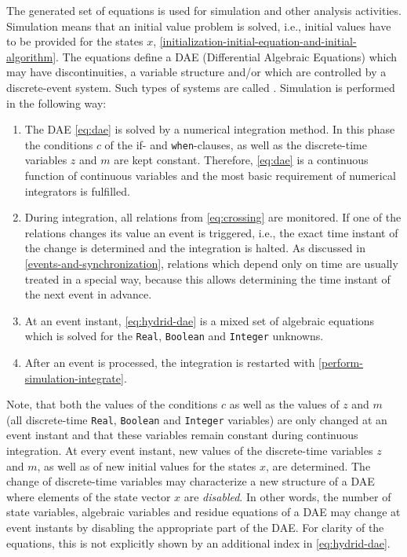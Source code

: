 The generated set of equations is used for simulation and other analysis activities.
Simulation means that an initial value problem is solved, i.e., initial values have to be provided for the states $x$, \cref{initialization-initial-equation-and-initial-algorithm}.
The equations define a DAE (Differential Algebraic Equations) which may have discontinuities, a variable structure and/or which are controlled by a discrete-event system.
Such types of systems are called .
Simulation is performed in the following way:
\begin{enumerate}
\item\label{perform-simulation-integrate}
  The DAE \eqref{eq:dae} is solved by a numerical integration method. In this
  phase the conditions $c$ of the if- and \lstinline!when!-clauses, as well as the
  discrete-time variables $z$ and $m$ are kept constant. Therefore, \eqref{eq:dae} is a
  continuous function of continuous variables and the most basic
  requirement of numerical integrators is fulfilled.
\item
  During integration, all relations from \eqref{eq:crossing} are monitored. If one of
  the relations changes its value an event is triggered, i.e., the exact
  time instant of the change is determined and the integration is
  halted. As discussed in \cref{events-and-synchronization}, relations which depend only on
  time are usually treated in a special way, because this allows
  determining the time instant of the next event in advance.
\item
  At an event instant, \eqref{eq:hydrid-dae} is a mixed set of algebraic equations which is solved for the \lstinline!Real!, \lstinline!Boolean! and \lstinline!Integer! unknowns.
\item
  After an event is processed, the integration is restarted with \ref{perform-simulation-integrate}.
\end{enumerate}

Note, that both the values of the conditions $c$ as well as the values of
$z$ and $m$ (all discrete-time \lstinline!Real!, \lstinline!Boolean! and \lstinline!Integer! variables) are only changed at
an event instant and that these variables remain constant during
continuous integration. At every event instant, new values of the
discrete-time variables $z$ and $m$, as well as of new initial values for the states $x$, are
determined. The change of discrete-time variables may characterize a new
structure of a DAE where elements of the state vector $x$ are
\emph{disabled}. In other words, the number of state variables,
algebraic variables and residue equations of a DAE may change at event
instants by disabling the appropriate part of the DAE. For clarity of
the equations, this is not explicitly shown by an additional index in
\eqref{eq:hydrid-dae}.

